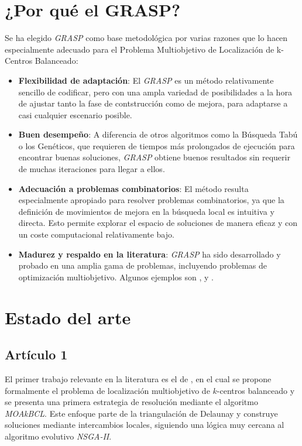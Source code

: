 \documentclass[12pt,a4paper]{book}
\begin{document}
\section{¿Por qué el GRASP?}
Se ha elegido \textit{GRASP} como base metodológica por varias razones que lo hacen especialmente adecuado para el Problema Multiobjetivo de Localización de k-Centros Balanceado:
\begin{itemize}
    \item \textbf{Flexibilidad de adaptación}: El \textit{GRASP} es un método relativamente sencillo de codificar, pero con una ampla variedad de posibilidades
    a la hora de ajustar tanto la fase de contstrucción como de mejora, para adaptarse a casi cualquier escenario posible. 
    \item \textbf{Buen desempeño}: A diferencia de otros algoritmos como la Búsqueda Tabú o los Genéticos, que requieren de tiempos más prolongados de ejecución para encontrar buenas soluciones,
    \textit{GRASP} obtiene buenos resultados sin requerir de muchas iteraciones para llegar a ellos.
    \item \textbf{Adecuación a problemas combinatorios}: El método resulta especialmente apropiado para resolver problemas combinatorios, ya que la definición de movimientos de mejora en la búsqueda local es intuitiva y directa.
    Esto permite explorar el espacio de soluciones de manera eficaz y con un coste computacional relativamente bajo.
    \item \textbf{Madurez y respaldo en la literatura}: \textit{GRASP} ha sido desarrollado y probado en una amplia gama de problemas, incluyendo problemas de optimización multiobjetivo. Algunos ejemplos son \cite{grasp_1}, \cite{grasp_3} y \cite{grasp_2}. 
\end{itemize}

\section{Estado del arte}

\subsection{Artículo 1}
El primer trabajo relevante en la literatura es el de \cite{k-balanced_1}, en el cual se propone formalmente el problema de localización multiobjetivo de $k$-centros balanceado y se presenta una primera estrategia de resolución mediante el algoritmo \textit{MOAkBCL}.
Este enfoque parte de la triangulación de Delaunay \citep{delaunay} y construye soluciones mediante intercambios locales, siguiendo una lógica muy cercana al algoritmo evolutivo \textit{NSGA-II}.
\end{document}
